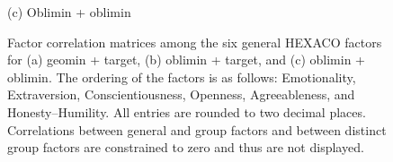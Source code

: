 \documentclass[
  12pt,
  letterpaper,
  article]{scrartcl}
\begin{document}
\begin{figure}[!htbp]
\begin{minipage}[t]{0.48\textwidth}
  \centering
  \setlength{\arraycolsep}{3pt}
  \renewcommand{\arraystretch}{1.15}
  \par\vspace{3pt}
  {\small(c) Oblimin + oblimin}
\end{minipage}

\caption{\fontsize{12}{12}\selectfont
Factor correlation matrices among the six general HEXACO factors for (a) geomin + target, (b) oblimin + target, and (c) oblimin + oblimin. The ordering of the factors is as follows: Emotionality, Extraversion, Conscientiousness, Openness, Agreeableness, and Honesty–Humility. All entries are rounded to two decimal places. Correlations between general and group factors and between distinct group factors are constrained to zero and thus are not displayed.}
\label{fig:hexaco-correlations-comparison}
\end{figure}
\end{document}
